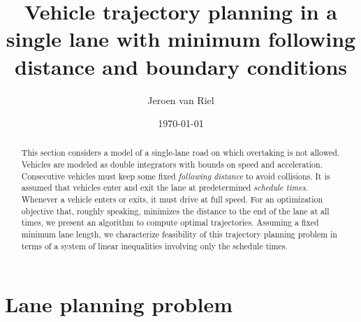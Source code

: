 \documentclass[a4paper]{article}
\author{Jeroen van Riel}
\date{\monthyeardate\today}
\title{Vehicle trajectory planning in a single lane with minimum following
  distance and boundary conditions}
\theoremstyle{definition}
\theoremstyle{plain}
\begin{document}
\maketitle

\begin{abstract}
  This section considers a model of a single-lane road on which overtaking is
  not allowed.
  Vehicles are modeled as double integrators with bounds on speed and
  acceleration. Consecutive vehicles must keep some fixed \textit{following
    distance} to avoid collisions.
  It is assumed that vehicles enter and exit the lane at
  predetermined \textit{schedule times}. Whenever a vehicle enters or exits, it
  must drive at full speed.
  For an optimization objective that, roughly speaking, minimizes the distance
  to the end of the lane at all times, we present an algorithm to compute
  optimal trajectories.
  Assuming a fixed minimum lane length, we characterize feasibility of this
  trajectory planning problem in terms of a system of linear inequalities
  involving only the schedule times.
\end{abstract}


\newcommand\halfopen[2]{\ensuremath{[#1,#2)}}
\newcommand\openhalf[2]{\ensuremath{(#1,#2]}}

\renewcommand{\labelitemii}{\textbullet}
\renewcommand{\labelitemiii}{\textbullet}

\section{Lane planning problem}
\end{document}
